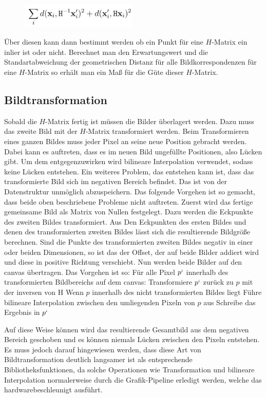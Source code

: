 \begin{figure}[ht]
    \centering
    \includegraphics[width=0.49\textwidth]{FiguresIS/47.jpg}
    \caption{\cite{Richard2000}}
\end{figure}

Über diesen kann dann bestimmt werden ob ein Punkt für eine $H$-Matrix ein inlier ist oder nicht. Berechnet man den Erwartungswert und die Standartabweichung der geometrischen Distanz für alle Bildkorrespondenzen für eine $H$-Matrix so erhält man ein Maß für die Güte dieser $H$-Matrix.

\subsection{Bildtransformation}
Sobald die $H$-Matrix fertig ist müssen die Bilder überlagert werden. Dazu muss das zweite Bild mit der $H$-Matrix transformiert werden. Beim Transformieren eines ganzen Bildes muss jeder Pixel an seine neue Position gebracht werden. Dabei kann es auftreten, dass es im neuen Bild ungefüllte Positionen, also Lücken gibt. Um dem entgegenzuwirken wird bilineare Interpolation verwendet, sodass keine Lücken entstehen. Ein weiteres Problem, das entstehen kann ist, dass das transformierte Bild sich im negativen Bereich befindet. Das ist von der Datenstruktur unmöglich abzuspeichern. Das folgende Vorgehen ist so gemacht, dass beide oben beschriebene Probleme nicht auftreten.
Zuerst wird das fertige gemeinsame Bild als Matrix von Nullen festgelegt. Dazu werden die Eckpunkte des zweiten Bildes transformiert. Aus Den Eckpunkten des ersten Bildes und denen des transformierten zweiten Bildes lässt sich die resultierende Bildgröße berechnen. Sind die Punkte des transformierten zweiten Bildes negativ in einer oder beiden Dimensionen, so ist das der Offset, der auf beide Bilder addiert wird und diese in positive Richtung verschiebt.
Nun werden beide Bilder auf den canvas übertragen. Das Vorgehen ist so:
Für alle Pixel $p`$ innerhalb des transformierten Bildbereichs auf dem canvas:
Transformiere $p`$ zurück zu $p$ mit der inversen von H
Wenn $p$ innerhalb des nicht transformierten Bildes liegt
	Führe bilineare Interpolation zwischen den umliegenden Pixeln von $p$ aus
	Schreibe das Ergebnis in $p`$

Auf diese Weise können wird das resultierende Gesamtbild aus dem negativen Bereich geschoben und es können niemals Lücken zwischen den Pixeln entstehen. Es muss jedoch darauf hingewiesen werden, dass diese Art von Bildtransformation deutlich langsamer ist als entsprechende Bibliotheksfunktionen, da solche Operationen wie Transformation und bilineare Interpolation normalerweise durch die Grafik-Pipeline erledigt werden, welche das hardwarebeschleunigt ausführt.

\clearpage

